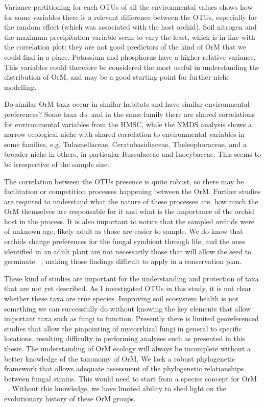 Variance partitioning for each OTUs of all the environmental values shows how for some variables there is a relevant difference between the OTUs, especially for the random effect (which was associated with the host orchid). Soil nitrogen and the maximum precipitation variable seem to vary the least, which is in line with the correlation plot: they are not good predictors of the kind of OrM that we could find in a place. Potassium and phosphorus have a higher relative variance.
This variables could therefore be considered the most useful in understanding the distribution of OrM, and may be a good starting point for further niche modelling.

Do similar OrM taxa occur in similar habitats and have similar environmental preferences? Some taxa do, and in the same family there are shared correlations for environmental variables from the HMSC, while the NMDS analysis shows a narrow ecological niche with shared correlation to environmental variables in some families, e.g. Tulasnellaceae, Ceratobasidiaceae, Theleophoraceae, and a broader niche in others, in particular Russulaceae and Inocybaceae. This seems to be irrespective of the sample size.

The correlation between the OTUs presence is quite robust, so there may be facilitation or competition processes happening between the OrM. Further studies are required to understand what the nature of these processes are, how much the OrM themselves are responsable for it and what is the importance of the orchid host in the process. It is also important to notice that the sampled orchids were of unknown age, likely adult as those are easier to sample. We do know that orchids change preferences for the fungal symbiont through life, and the ones identified in an adult plant are not necessarily those that will allow the seed to germinate ~\citep{meng2019}, making those findings difficult to apply in a conservation plan.

These kind of studies are important for the understanding and protection of taxa that are not yet described. As I investigated OTUs in this study, it is not clear whether these taxa are true species. Improving soil ecosystem health is not something we can successfully do without knowing the key elements that allow important taxa such as fungi to function. Presently there is limited georeferenced studies that allow the pinpointing of mycorrhizal fungi in general to specific locations, resulting difficulty in performing analyses such as presented in this thesis. The understanding of OrM ecology will always be incomplete without a better knowledge of the taxonomy of OrM. We lack a robust phylogenetic framework that allows adequate assessment of the phylogenetic relationships between fungal strains. This would need to start from a species concept for OrM ~\citep{jacquemyn2017}. Without this knowledge, we have limited ability to shed light on the evolutionary history of these OrM groups.

